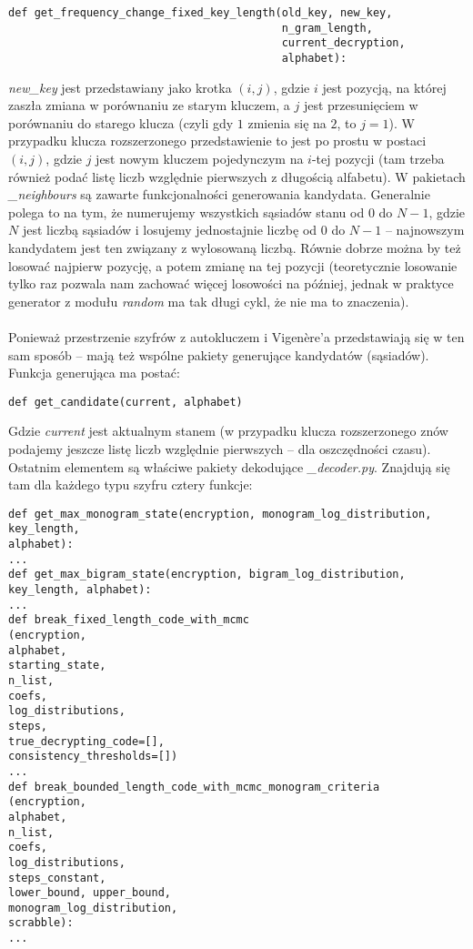 \documentclass[a4paper]{article}
\theoremstyle{defn}
\theoremstyle{theorem}
\theoremstyle{lemma}
\theoremstyle{cor}
\theoremstyle{fact}
\begin{document}
\begin{lstlisting}
def get_frequency_change_fixed_key_length(old_key, new_key,
                                          n_gram_length, 
                                          current_decryption, 
                                          alphabet):
\end{lstlisting}
\textit{new\_key} jest przedstawiany jako krotka $(i,j)$, gdzie $i$ jest pozycją, na której zaszła zmiana w porównaniu ze starym kluczem, a $j$ jest przesunięciem w porównaniu do starego klucza (czyli gdy $1$ zmienia się na $2$, to $j=1$). W przypadku klucza rozszerzonego przedstawienie to jest po prostu w postaci $(i,j)$, gdzie $j$ jest nowym kluczem pojedynczym na $i$-tej pozycji (tam trzeba również podać listę liczb względnie pierwszych z długością alfabetu). W pakietach \textit{\_neighbours} są zawarte funkcjonalności generowania kandydata. Generalnie polega to na tym, że numerujemy wszystkich sąsiadów stanu od $0$ do $N-1$, gdzie $N$ jest liczbą sąsiadów i losujemy jednostajnie liczbę od $0$ do $N-1$ – najnowszym kandydatem jest ten związany z wylosowaną liczbą. Równie dobrze można by też losować najpierw pozycję, a potem zmianę na tej pozycji (teoretycznie losowanie tylko raz pozwala nam zachować więcej losowości na później, jednak w praktyce generator z modułu \textit{random} ma tak długi cykl, że nie ma to znaczenia).\\\\
Ponieważ przestrzenie szyfrów z autokluczem i Vigenère'a przedstawiają się w ten sam sposób – mają też wspólne pakiety generujące kandydatów (sąsiadów). Funkcja generująca ma postać:
\begin{lstlisting}
def get_candidate(current, alphabet)
\end{lstlisting}
Gdzie \textit{current} jest aktualnym stanem (w przypadku klucza rozszerzonego znów podajemy jeszcze listę liczb względnie pierwszych – dla oszczędności czasu).\\
Ostatnim elementem są właściwe pakiety dekodujące \textit{\_decoder.py}. Znajdują się tam dla każdego typu szyfru cztery funkcje:
\begin{lstlisting}
def get_max_monogram_state(encryption, monogram_log_distribution, key_length,
alphabet):
...
def get_max_bigram_state(encryption, bigram_log_distribution, key_length, alphabet):
...
def break_fixed_length_code_with_mcmc
(encryption, 
alphabet, 
starting_state, 
n_list, 
coefs, 
log_distributions, 
steps,
true_decrypting_code=[], 
consistency_thresholds=[])
...
def break_bounded_length_code_with_mcmc_monogram_criteria
(encryption,                                                                  alphabet, 
n_list, 
coefs,   
log_distributions, 
steps_constant, 
lower_bound, upper_bound, 
monogram_log_distribution, 
scrabble):
...
\end{lstlisting}
\end{document}

